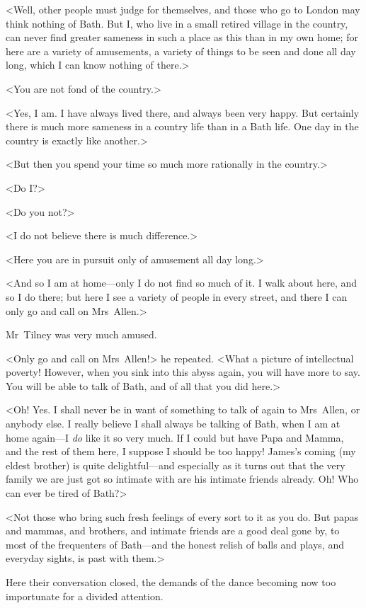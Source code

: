  <Well, other people must judge for themselves, and those who go to London may think nothing of Bath. But I, who live in a small retired village in the country, can never find greater sameness in such a place as this than in my own home; for here are a variety of amusements, a variety of things to be seen and done all day long, which I can know nothing of there.> 

 <You are not fond of the country.> 

 <Yes, I am. I have always lived there, and always been very happy. But certainly there is much more sameness in a country life than in a Bath life. One day in the country is exactly like another.> 

 <But then you spend your time so much more rationally in the country.> 

 <Do I?> 

 <Do you not?> 

 <I do not believe there is much difference.> 

 <Here you are in pursuit only of amusement all day long.> 

 <And so I am at home—only I do not find so much of it. I walk about here, and so I do there; but here I see a variety of people in every street, and there I can only go and call on Mrs~Allen.> 

 Mr~Tilney was very much amused. 

 <Only go and call on Mrs~Allen!> he repeated. <What a picture of intellectual poverty! However, when you sink into this abyss again, you will have more to say. You will be able to talk of Bath, and of all that you did here.> 

 <Oh! Yes. I shall never be in want of something to talk of again to Mrs~Allen, or anybody else. I really believe I shall always be talking of Bath, when I am at home again—I \textit{do} like it so very much. If I could but have Papa and Mamma, and the rest of them here, I suppose I should be too happy! James's coming (my eldest brother) is quite delightful—and especially as it turns out that the very family we are just got so intimate with are his intimate friends already. Oh! Who can ever be tired of Bath?> 

 <Not those who bring such fresh feelings of every sort to it as you do. But papas and mammas, and brothers, and intimate friends are a good deal gone by, to most of the frequenters of Bath—and the honest relish of balls and plays, and everyday sights, is past with them.> 

 Here their conversation closed, the demands of the dance becoming now too importunate for a divided attention. 

